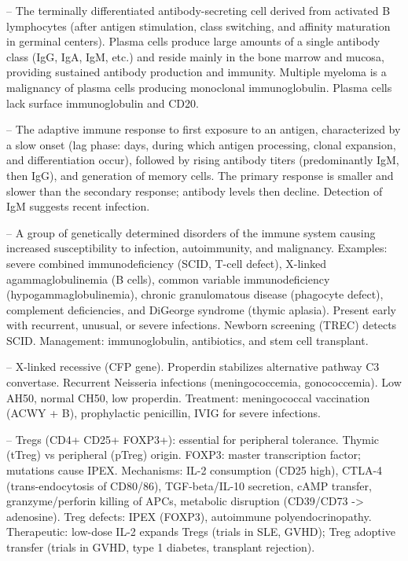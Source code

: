 -- The terminally differentiated antibody-secreting cell derived from activated B lymphocytes (after antigen stimulation, class switching, and affinity maturation in germinal centers). Plasma cells produce large amounts of a single antibody class (IgG, IgA, IgM, etc.) and reside mainly in the bone marrow and mucosa, providing sustained antibody production and immunity. Multiple myeloma is a malignancy of plasma cells producing monoclonal immunoglobulin. Plasma cells lack surface immunoglobulin and CD20.

-- The adaptive immune response to first exposure to an antigen, characterized by a slow onset (lag phase: days, during which antigen processing, clonal expansion, and differentiation occur), followed by rising antibody titers (predominantly IgM, then IgG), and generation of memory cells. The primary response is smaller and slower than the secondary response; antibody levels then decline. Detection of IgM suggests recent infection.

-- A group of genetically determined disorders of the immune system causing increased susceptibility to infection, autoimmunity, and malignancy. Examples: severe combined immunodeficiency (SCID, T-cell defect), X-linked agammaglobulinemia (B cells), common variable immunodeficiency (hypogammaglobulinemia), chronic granulomatous disease (phagocyte defect), complement deficiencies, and DiGeorge syndrome (thymic aplasia). Present early with recurrent, unusual, or severe infections. Newborn screening (TREC) detects SCID. Management: immunoglobulin, antibiotics, and stem cell transplant.

-- X-linked recessive (CFP gene). Properdin stabilizes alternative pathway C3 convertase. Recurrent Neisseria infections (meningococcemia, gonococcemia). Low AH50, normal CH50, low properdin. Treatment: meningococcal vaccination (ACWY + B), prophylactic penicillin, IVIG for severe infections.

-- Tregs (CD4+ CD25+ FOXP3+): essential for peripheral tolerance. Thymic (tTreg) vs peripheral (pTreg) origin. FOXP3: master transcription factor; mutations cause IPEX. Mechanisms: IL-2 consumption (CD25 high), CTLA-4 (trans-endocytosis of CD80/86), TGF-beta/IL-10 secretion, cAMP transfer, granzyme/perforin killing of APCs, metabolic disruption (CD39/CD73 -> adenosine). Treg defects: IPEX (FOXP3), autoimmune polyendocrinopathy. Therapeutic: low-dose IL-2 expands Tregs (trials in SLE, GVHD); Treg adoptive transfer (trials in GVHD, type 1 diabetes, transplant rejection).

